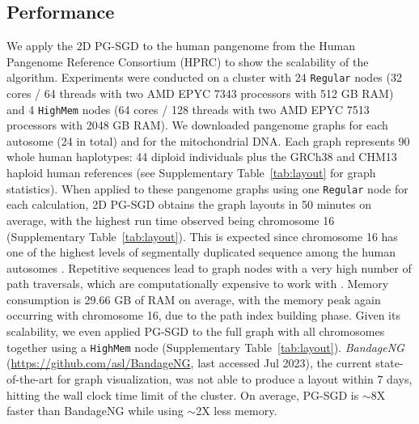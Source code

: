 \documentclass{bioinfo}
\theoremstyle{definition}
\begin{document}
    \subsection{Performance}
	We apply the 2D PG-SGD to the human pangenome \citep{Liao2023} from the Human Pangenome Reference Consortium (HPRC) to show the scalability of the algorithm.	
	Experiments were conducted on a cluster with 24 \texttt{Regular} nodes (32 cores / 64 threads with two AMD EPYC 7343 processors with 512 GB RAM) and 4 \texttt{HighMem} nodes (64 cores / 128 threads with two AMD EPYC 7513 processors with 2048 GB RAM).
	We downloaded pangenome graphs for each autosome (24 in total) and for the mitochondrial DNA.
	Each graph represents 90 whole human haplotypes: 44 diploid individuals plus the GRCh38 \citep{Schneider2017} and CHM13 \citep{Nurk_2021} haploid human references (see Supplementary Table~\ref{tab:layout} for graph statistics).
	When applied to these pangenome graphs using one \texttt{Regular} node for each calculation, 2D PG-SGD obtains the graph layouts in 50 minutes on average, with the highest run time observed being chromosome 16 (Supplementary Table~\ref{tab:layout}).
	This is expected since chromosome 16 has one of the highest levels of segmentally duplicated sequence among the human autosomes \citep{Martin2004}.
	Repetitive sequences lead to graph nodes with a very high number of path traversals, which are computationally expensive to work with \citep{Guarracino2022}.
	Memory consumption is 29.66 GB of RAM on average, with the memory peak again occurring with chromosome 16, due to the path index building phase.
	Given its scalability, we even applied PG-SGD to the full graph with all chromosomes together using a \texttt{HighMem} node (Supplementary Table~\ref{tab:layout}). 
	\textit{BandageNG} (\url{https://github.com/asl/BandageNG}, last accessed Jul 2023), the current state-of-the-art for graph visualization, was not able to produce a layout within 7 days, hitting the wall clock time limit of the cluster.
	On average, PG-SGD is $\sim$8X faster than BandageNG while using $\sim$2X less memory.
\end{document}
